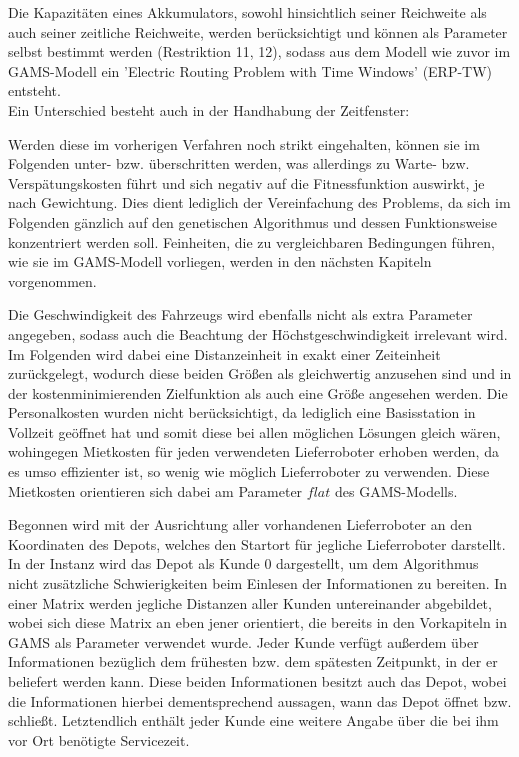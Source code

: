 \documentclass[a4paper,12pt,parskip,bibtotoc,liststotoc]{article}
\begin{document}
Die Kapazitäten eines Akkumulators, sowohl hinsichtlich seiner Reichweite als auch seiner zeitliche Reichweite, werden berücksichtigt und können als Parameter selbst bestimmt werden (Restriktion 11, 12), sodass aus dem Modell wie zuvor im GAMS-Modell ein 'Electric Routing Problem with Time Windows' (ERP-TW) entsteht.\\

Ein Unterschied besteht auch in der Handhabung der Zeitfenster:

Werden diese im vorherigen Verfahren noch strikt eingehalten, können sie im Folgenden unter- bzw. überschritten werden, was allerdings zu Warte- bzw. Verspätungskosten führt und sich negativ auf die Fitnessfunktion auswirkt, je nach Gewichtung.
Dies dient lediglich der Vereinfachung des Problems, da sich im Folgenden gänzlich auf den genetischen Algorithmus und dessen Funktionsweise konzentriert werden soll. 
Feinheiten, die zu vergleichbaren Bedingungen führen, wie sie im GAMS-Modell vorliegen, werden in den nächsten Kapiteln vorgenommen. 

Die Geschwindigkeit des Fahrzeugs wird ebenfalls nicht als extra Parameter angegeben, sodass auch die Beachtung der Höchstgeschwindigkeit irrelevant wird.
Im Folgenden wird dabei eine Distanzeinheit in exakt einer Zeiteinheit zurückgelegt, wodurch diese beiden Größen als gleichwertig anzusehen sind und in der kostenminimierenden Zielfunktion als auch eine Größe angesehen werden.
Die Personalkosten wurden nicht berücksichtigt, da lediglich eine Basisstation in Vollzeit geöffnet hat und somit diese bei allen möglichen Lösungen gleich wären, wohingegen Mietkosten für jeden verwendeten Lieferroboter erhoben werden, da es umso effizienter ist, so wenig wie möglich Lieferroboter zu verwenden.
Diese Mietkosten orientieren sich dabei am Parameter $flat$ des GAMS-Modells.

Begonnen wird mit der Ausrichtung aller vorhandenen Lieferroboter an den Koordinaten des Depots, welches den Startort für jegliche Lieferroboter darstellt.
In der Instanz wird das Depot als Kunde 0 dargestellt, um dem Algorithmus nicht zusätzliche Schwierigkeiten beim Einlesen der Informationen zu bereiten.
In einer Matrix werden jegliche Distanzen aller Kunden untereinander abgebildet, wobei sich diese Matrix an eben jener orientiert, die bereits in den Vorkapiteln in GAMS als Parameter verwendet wurde.
Jeder Kunde verfügt außerdem über Informationen bezüglich dem frühesten bzw. dem spätesten Zeitpunkt, in der er beliefert werden kann.
Diese beiden Informationen besitzt auch das Depot, wobei die Informationen hierbei dementsprechend aussagen, wann das Depot öffnet bzw. schließt.
Letztendlich enthält jeder Kunde eine weitere Angabe über die bei ihm vor Ort benötigte Servicezeit.
\end{document}
